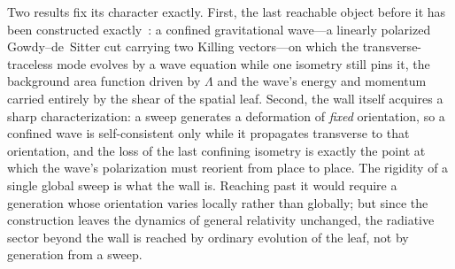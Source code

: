 \documentclass[11pt,a4paper]{article}
\theoremstyle{definition}
\begin{document}
Two results fix its character exactly. First, the last reachable object before it has been constructed exactly~\cite{JanzenDynamics}: a confined gravitational wave---a linearly polarized Gowdy--de~Sitter cut carrying two Killing vectors---on which the transverse-traceless mode evolves by a wave equation while one isometry still pins it, the background area function driven by $\Lambda$ and the wave's energy and momentum carried entirely by the shear of the spatial leaf. Second, the wall itself acquires a sharp characterization: a sweep generates a deformation of \emph{fixed} orientation, so a confined wave is self-consistent only while it propagates transverse to that orientation, and the loss of the last confining isometry is exactly the point at which the wave's polarization must reorient from place to place. The rigidity of a single global sweep is what the wall is. Reaching past it would require a generation whose orientation varies locally rather than globally; but since the construction leaves the dynamics of general relativity unchanged, the radiative sector beyond the wall is reached by ordinary evolution of the leaf, not by generation from a sweep. 
\end{document}
